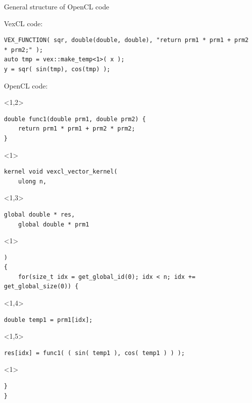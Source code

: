 \documentclass[@BEAMER_OPTIONS@]{beamer}
\begin{document}
\begin{frame}[fragile,shrink=5]{General structure of OpenCL code}
    \begin{exampleblock}{VexCL code:}
            \begin{lstlisting}
VEX_FUNCTION( sqr, double(double, double), "return prm1 * prm1 + prm2 * prm2;" );
auto tmp = vex::make_temp<1>( x );
y = sqr( sin(tmp), cos(tmp) );
            \end{lstlisting}
    \end{exampleblock}
    \begin{exampleblock}{OpenCL code:}
        \begin{uncoverenv}<1,2>
            \begin{lstlisting}
double func1(double prm1, double prm2) {
    return prm1 * prm1 + prm2 * prm2;
}
            \end{lstlisting}
        \end{uncoverenv}
        \begin{uncoverenv}<1>
            \begin{lstlisting}[firstnumber=last]
kernel void vexcl_vector_kernel(
    ulong n,
            \end{lstlisting}
        \end{uncoverenv}
        \begin{uncoverenv}<1,3>
            \begin{lstlisting}[firstnumber=last]
    global double * res,
    global double * prm1
            \end{lstlisting}
        \end{uncoverenv}
        \begin{uncoverenv}<1>
            \begin{lstlisting}[firstnumber=last]
)
{
    for(size_t idx = get_global_id(0); idx < n; idx += get_global_size(0)) {
            \end{lstlisting}
        \end{uncoverenv}
        \begin{uncoverenv}<1,4>
            \begin{lstlisting}[firstnumber=last]
        double temp1 = prm1[idx];
            \end{lstlisting}
        \end{uncoverenv}
        \begin{uncoverenv}<1,5>
            \begin{lstlisting}[firstnumber=last]
        res[idx] = func1( ( sin( temp1 ), cos( temp1 ) ) );
            \end{lstlisting}
        \end{uncoverenv}
        \begin{uncoverenv}<1>
            \begin{lstlisting}[firstnumber=last]
    }
}
            \end{lstlisting}
        \end{uncoverenv}
    \end{exampleblock}
\end{frame}
\end{document}

